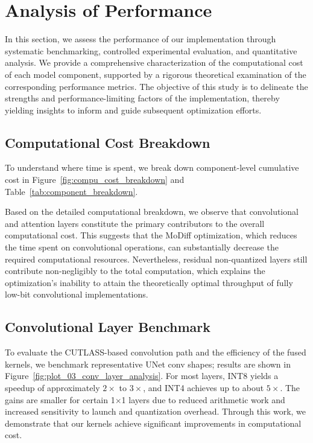 \section{Analysis of Performance}
\label{sec:analysis}

In this section, we assess the performance of our implementation through systematic benchmarking, controlled experimental evaluation, and quantitative analysis. We provide a comprehensive characterization of the computational cost of each model component, supported by a rigorous theoretical examination of the corresponding performance metrics. The objective of this study is to delineate the strengths and performance-limiting factors of the implementation, thereby yielding insights to inform and guide subsequent optimization efforts.


\subsection{Computational Cost Breakdown}

To understand where time is spent, we break down component-level cumulative cost in Figure~\ref{fig:compu_cost_breakdown} and Table~\ref{tab:component_breakdown}.

Based on the detailed computational breakdown, we observe that convolutional and attention layers constitute the primary contributors to the overall computational cost. This suggests that the MoDiff optimization, which reduces the time spent on convolutional operations, can substantially decrease the required computational resources. Nevertheless, residual non-quantized layers still contribute non-negligibly to the total computation, which explains the optimization's inability to attain the theoretically optimal throughput of fully low-bit convolutional implementations.




\subsection{Convolutional Layer Benchmark}

To evaluate the CUTLASS-based convolution path and the efficiency of the fused kernels, we benchmark representative UNet conv shapes; results are shown in Figure~\ref{fig:plot_03_conv_layer_analysis}. For most layers, INT8 yields a speedup of approximately $2\times$ to $3\times$, and INT4 achieves up to about $5\times$. The gains are smaller for certain 1$\times$1 layers due to reduced arithmetic work and increased sensitivity to launch and quantization overhead. Through this work, we demonstrate that our kernels achieve significant improvements in computational cost.
